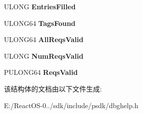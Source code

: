 \begin{DoxyCompactItemize}
U\+L\+O\+NG {\bfseries Entries\+Filled}
\item 
\mbox{\label{struct___i_m_a_g_e_h_l_p___g_e_t___t_y_p_e___i_n_f_o___p_a_r_a_m_s_a40c391140229e3a2bce01b351e374c81}} 
U\+L\+O\+N\+G64 {\bfseries Tags\+Found}
\item 
\mbox{\label{struct___i_m_a_g_e_h_l_p___g_e_t___t_y_p_e___i_n_f_o___p_a_r_a_m_s_adccd099d9c8004e05b16570b5d8f849c}} 
U\+L\+O\+N\+G64 {\bfseries All\+Reqs\+Valid}
\item 
\mbox{\label{struct___i_m_a_g_e_h_l_p___g_e_t___t_y_p_e___i_n_f_o___p_a_r_a_m_s_a77bf0f5f520fdc28d50b60bd8b51f287}} 
U\+L\+O\+NG {\bfseries Num\+Reqs\+Valid}
\item 
\mbox{\label{struct___i_m_a_g_e_h_l_p___g_e_t___t_y_p_e___i_n_f_o___p_a_r_a_m_s_af37adc8eb2df06fb1ac69d415667baa6}} 
P\+U\+L\+O\+N\+G64 {\bfseries Reqs\+Valid}
\end{DoxyCompactItemize}


该结构体的文档由以下文件生成\+:\begin{DoxyCompactItemize}
\item 
E\+:/\+React\+O\+S-\/0../sdk/include/psdk/dbghelp.\+h\end{DoxyCompactItemize}
